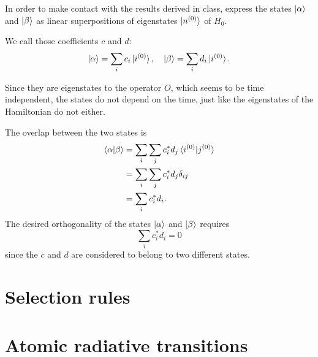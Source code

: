\documentclass[11pt, english, fleqn, DIV=15, headinclude, BCOR=1.5cm]{scrartcl}
\begin{document}
\begin{problem}
    In order to make contact with the results derived in class, express the
    states $\ket\alpha$ and $\ket\beta$ as linear superpositions of eigenstates
    $\ket{n{}^{(0)}}$ of $H_0$.
\end{problem}

We call those coefficients $c$ and $d$:
\[
    \ket\alpha = \sum_i c_i \ket{i{}^{(0)}}
    ,\quad
    \ket\beta = \sum_i d_i \ket{i{}^{(0)}}.
\]

Since they are eigenstates to the operator $O$, which seems to be time
independent, the states do not depend on the time, just like the eigenstates of
the Hamiltonian do not either.

The overlap between the two states is
\begin{align*}
    \braket{\alpha|\beta}
    &= \sum_i \sum_j c_i^* d_j \braket{i{}^{(0)} | j{}^{(0)}} \\
    &= \sum_i \sum_j c_i^* d_j \delta_{ij} \\
    &= \sum_i c_i^* d_i.
\end{align*}
The desired orthogonality of the states $\ket\alpha$ and $\ket\beta$ requires
\[
    \sum_i c_i^* d_i = 0
\]
since the $c$ and $d$ are considered to belong to two different states.

\section{Selection rules}

\section{Atomic radiative transitions}
\end{document}
